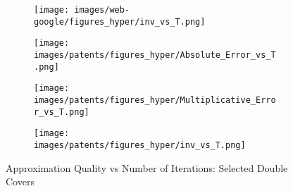 \begin{figure*}[htbp]
\begin{subfigure}[b]{\textwidth}
\begin{minipage}[b]{0.3\textwidth}
			\texttt{[image: images/web-google/figures\_hyper/inv\_vs\_T.png]} %
		\end{minipage}
	\end{subfigure}
	\begin{subfigure}[b]{\textwidth}
		\centering
		\begin{minipage}[b]{0.05\textwidth}
			\centering
		\end{minipage}%
		\begin{minipage}[b]{0.3\textwidth}
			\centering
			\texttt{[image: images/patents/figures\_hyper/Absolute\_Error\_vs\_T.png]} %
			
		\end{minipage}%
		\begin{minipage}[b]{0.3\textwidth}
			\centering
			\texttt{[image: images/patents/figures\_hyper/Multiplicative\_Error\_vs\_T.png]} %
			
		\end{minipage}%
		\begin{minipage}[b]{0.3\textwidth}
			\centering
			\texttt{[image: images/patents/figures\_hyper/inv\_vs\_T.png]} %
		\end{minipage}
	\end{subfigure}
	\caption{Approximation Quality vs Number of Iterations: Selected Double Covers}
	\label{fig:errors_hyper}
\end{figure*}







